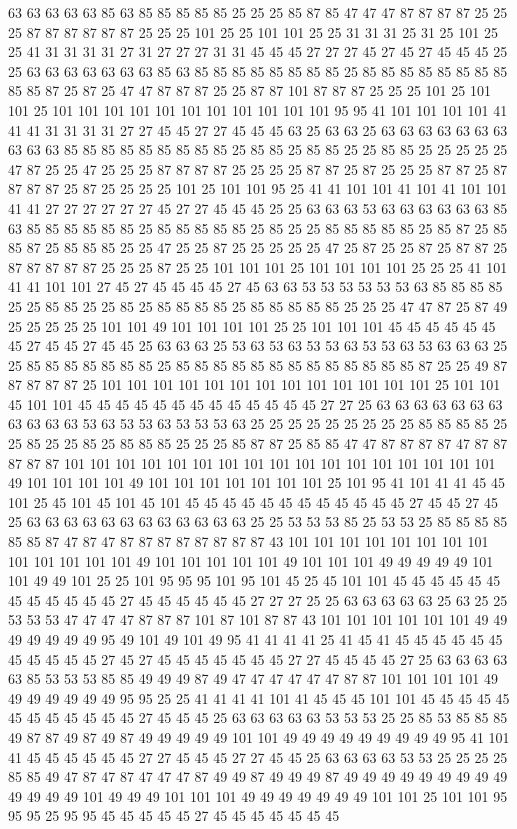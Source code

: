 63 63 63 63 63 85 63 85 85 85 85 85 25 25 25 85 87 85 47 47 47 87 87 87 87 25 25 25 87 87 87 87 87 87 25 25 25 101 25 25 101 101 25 25 31 31 31 25 31 25 101 25 25 41 31 31 31 31 27 31 27 27 27 31 31 45 45 45 27 27 27 45 27 45 27 45 45 45 25 25 63 63 63 63 63 63 63 85 63 85 85 85 85 85 85 85 85 25 85 85 85 85 85 85 85 85 85 85 87 25 87 25 47 47 87 87 87 25 25 87 87 101 87 87 87 25 25 25 101 25 101 101 25 101 101 101 101 101 101 101 101 101 101 101 95 95 41 101 101 101 101 41 41 41 31 31 31 31 27 27 45 45 27 27 45 45 45 63 25 63 63 25 63 63 63 63 63 63 63 63 63 63 85 85 85 85 85 85 85 85 85 25 85 85 25 85 85 25 25 85 85 25 25 25 25 25 47 87 25 25 47 25 25 25 87 87 87 87 25 25 25 25 87 87 25 87 25 25 25 87 87 25 87 87 87 87 25 87 25 25 25 25 101 25 101 101 95 25 41 41 101 101 41 101 41 101 101 41 41 27 27 27 27 27 27 45 27 27 45 45 45 25 25 63 63 63 53 63 63 63 63 63 63 85 63 85 85 85 85 85 85 25 85 85 85 85 85 25 85 25 25 85 85 85 85 85 25 85 87 25 85 85 87 25 85 85 85 25 25 47 25 25 87 25 25 25 25 25 47 25 87 25 25 87 25 87 87 25 87 87 87 87 87 25 25 25 87 25 25 101 101 101 25 101 101 101 101 25 25 25 41 101 41 41 101 101 27 45 27 45 45 45 45 27 45 63 63 53 53 53 53 53 53 63 85 85 85 85 25 25 85 85 25 25 85 25 85 85 85 85 25 85 85 85 85 85 25 25 25 47 47 87 25 87 49 25 25 25 25 25 101 101 49 101 101 101 101 25 25 101 101 101 45 45 45 45 45 45 45 27 45 45 27 45 45 25 63 63 63 25 53 63 53 63 53 53 63 53 53 63 53 63 63 63 25 25 85 85 85 85 85 85 85 25 85 85 85 85 85 85 85 85 85 85 85 85 85 87 25 25 49 87 87 87 87 87 25 101 101 101 101 101 101 101 101 101 101 101 101 101 25 101 101 45 101 101 45 45 45 45 45 45 45 45 45 45 45 45 45 27 27 25 63 63 63 63 63 63 63 63 63 63 63 53 63 53 53 63 53 53 53 63 25 25 25 25 25 25 25 25 25 85 85 85 85 25 25 85 25 25 85 25 85 85 85 25 25 25 85 87 87 25 85 85 47 47 87 87 87 87 47 87 87 87 87 87 101 101 101 101 101 101 101 101 101 101 101 101 101 101 101 101 101 49 101 101 101 101 49 101 101 101 101 101 101 101 25 101 95 41 101 41 41 45 45 101 25 45 101 45 101 45 101 45 45 45 45 45 45 45 45 45 45 45 45 27 45 45 27 45 25 63 63 63 63 63 63 63 63 63 63 63 63 25 25 53 53 53 85 25 53 53 25 85 85 85 85 85 85 87 47 87 47 87 87 87 87 87 87 87 87 43 101 101 101 101 101 101 101 101 101 101 101 101 101 49 101 101 101 101 101 49 101 101 101 49 49 49 49 49 101 101 49 49 101 25 25 101 95 95 95 101 95 101 45 25 45 101 101 45 45 45 45 45 45 45 45 45 45 45 45 27 45 45 45 45 45 45 27 27 27 25 25 63 63 63 63 63 25 63 25 25 53 53 53 47 47 47 47 87 87 87 101 87 101 87 87 43 101 101 101 101 101 101 49 49 49 49 49 49 49 95 49 101 49 101 49 95 41 41 41 41 25 41 45 41 45 45 45 45 45 45 45 45 45 45 45 27 45 27 45 45 45 45 45 45 45 27 27 45 45 45 45 27 25 63 63 63 63 63 85 53 53 53 85 85 49 49 49 87 49 47 47 47 47 47 47 87 87 101 101 101 101 49 49 49 49 49 49 49 95 95 25 25 41 41 41 41 101 41 45 45 45 101 101 45 45 45 45 45 45 45 45 45 45 45 45 27 45 45 45 25 63 63 63 63 63 53 53 53 25 25 85 53 85 85 85 49 87 87 49 87 49 87 49 49 49 49 49 101 101 49 49 49 49 49 49 49 49 49 95 41 101 41 45 45 45 45 45 45 27 27 45 45 45 27 27 45 45 25 63 63 63 63 53 53 25 25 25 25 85 85 49 47 87 47 87 47 47 47 87 49 49 87 49 49 49 87 49 49 49 49 49 49 49 49 49 49 49 49 49 101 49 49 49 101 101 101 49 49 49 49 49 49 49 101 101 25 101 101 95 95 95 25 95 95 45 45 45 45 45 27 45 45 45 45 45 45 45 